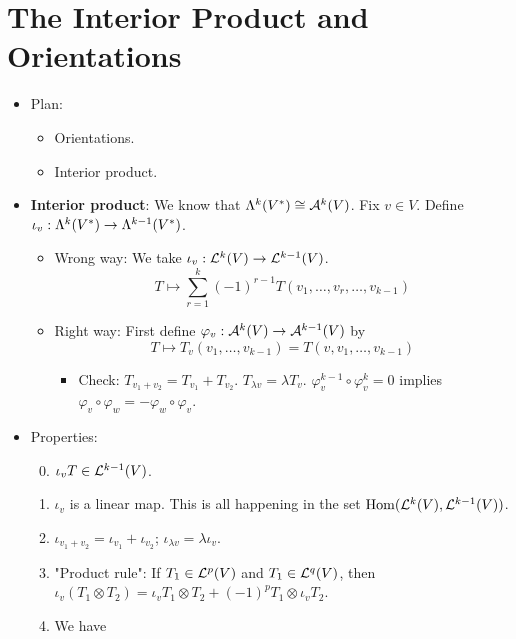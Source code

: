 \documentclass[../notes.tex]{subfiles}
\begin{document}
\section{The Interior Product and Orientations}
\begin{itemize}
    \item {}Plan:
    \begin{itemize}
        \item Orientations.
        \item Interior product.
    \end{itemize}
    \item \textbf{Interior product}: We know that $\lam[k]{V^*}\cong\alt[k]{V}$. Fix $v\in V$. Define $\iota_v:\lam[k]{V^*}\to\lam[k-1]{V^*}$.
    \begin{itemize}
        \item Wrong way: We take $\iota_v:\lin[k]{V}\to\lin[k-1]{V}$.
        \begin{equation*}
            T \mapsto \sum_{r=1}^k(-1)^{r-1}T(v_1,\dots,v_r,\dots,v_{k-1})
        \end{equation*}
        \item Right way: First define $\varphi_v:\alt[k]{V}\to\alt[k-1]{V}$ by
        \begin{equation*}
            T \mapsto T_v(v_1,\dots,v_{k-1})=T(v,v_1,\dots,v_{k-1})
        \end{equation*}
        \begin{itemize}
            \item Check: $T_{v_1+v_2}=T_{v_1}+T_{v_2}$. $T_{\lambda v}=\lambda T_v$. $\varphi_v^{k-1}\circ\varphi_v^k=0$ implies $\varphi_v\circ\varphi_w=-\varphi_w\circ\varphi_v$.
        \end{itemize}
    \end{itemize}
    \item Properties:
    \begin{enumerate}
        \setcounter{enumi}{-1}
        \item $\iota_vT\in\lin[k-1]{V}$.
        \item $\iota_v$ is a linear map. This is all happening in the set $\Hom(\lin[k]{V},\lin[k-1]{V})$.
        \item $\iota_{v_1+v_2}=\iota_{v_1}+\iota_{v_2}$; $\iota_{\lambda v}=\lambda\iota_v$.
        \item "Product rule": If $T_1\in\lin[p]{V}$ and $T_1\in\lin[q]{V}$, then $\iota_v(T_1\otimes T_2)=\iota_vT_1\otimes T_2+(-1)^pT_1\otimes\iota_vT_2$.
        \item We have

\end{enumerate}
\end{itemize}
\end{document}
